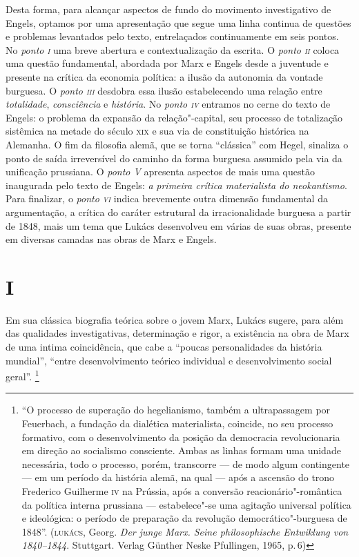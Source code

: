 Desta forma, para alcançar aspectos de fundo do movimento investigativo
de Engels, optamos por uma apresentação que segue uma linha continua de
questões e problemas levantados pelo texto, entrelaçados continuamente
em seis pontos. No \emph{ponto \textsc{i}} uma breve abertura e contextualização
da escrita. O \emph{ponto \textsc{ii}} coloca uma questão fundamental, abordada
por Marx e Engels desde a juventude e presente na crítica da economia
política: a ilusão da autonomia da vontade burguesa. O \emph{ponto \textsc{iii}}
desdobra essa ilusão estabelecendo uma relação entre \emph{totalidade},
\emph{consciência} e \emph{história}. No \emph{ponto \textsc{iv}} entramos no
cerne do texto de Engels: o problema da expansão da relação"-capital, seu
processo de totalização sistêmica na metade do século \textsc{xix} e sua via de
constituição histórica na Alemanha. O fim da filosofia alemã, que se
torna ``clássica'' com Hegel, sinaliza o ponto de saída irreversível do
caminho da forma burguesa assumido pela via da unificação prussiana. O
\emph{ponto V} apresenta aspectos de mais uma questão inaugurada pelo
texto de Engels: \emph{a} \emph{primeira crítica materialista do
neokantismo}. Para finalizar, o \emph{ponto \textsc{vi}} indica brevemente outra
dimensão fundamental da argumentação, a crítica do caráter estrutural da
irracionalidade burguesa a partir de 1848, mais um tema que Lukács
desenvolveu em várias de suas obras, presente em diversas camadas nas
obras de Marx e Engels.

\section*{I}

Em sua clássica biografia teórica sobre o jovem Marx, Lukács sugere,
para além das qualidades investigativas, determinação e rigor, a
existência na obra de Marx de uma intima coincidência, que cabe a
``poucas personalidades da história mundial'', ``entre desenvolvimento
teórico individual e desenvolvimento social geral''. \footnote{``O
  processo de superação do hegelianismo, também a ultrapassagem por
  Feuerbach, a fundação da dialética materialista, coincide, no seu
  processo formativo, com o desenvolvimento da posição da democracia
  revolucionaria em direção ao socialismo consciente. Ambas as linhas
  formam uma unidade necessária, todo o processo, porém, transcorre --- de
  modo algum contingente --- em um período da história alemã, na qual ---
  após a ascensão do trono Frederico Guilherme \textsc{iv} na Prússia, após a
  conversão reacionário"-romântica da política interna prussiana ---
  estabelece"-se uma agitação universal política e ideológica: o período
  de preparação da revolução democrático"-burguesa de 1848''. (\textsc{lukács},
  Georg. \emph{Der junge Marx. Seine philosophische Entwiklung von
  1840--1844}. Stuttgart. Verlag Günther Neske Pfullingen, 1965, p.\,6)}

